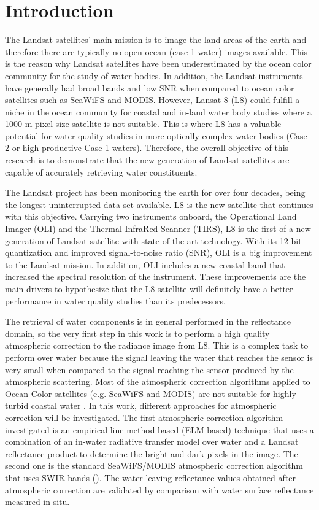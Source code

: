 \chapter{Introduction}
\label{ch:introduction} 
The Landsat satellites' main mission is to image the land areas of the earth and therefore there are typically no open ocean (case 1 water) images available. This is the reason why Landsat satellites have been underestimated by the ocean color community for the study of water bodies. In addition, the Landsat instruments have generally had broad bands and low SNR when compared to ocean color satellites such as SeaWiFS and MODIS. However, Lansat-8 (L8) could fulfill a niche in the ocean community for coastal and in-land water  body studies where a 1000 m pixel size satellite is not suitable. This is where L8 has a valuable potential for water quality studies in more optically complex water bodies (Case 2 or high productive Case 1 waters). Therefore, the overall objective of this research is to demonstrate that the new generation of Landsat satellites are capable of accurately retrieving water constituents.

The Landsat project has been monitoring the earth for over four decades, being the longest uninterrupted data set available. L8 is the new satellite that continues with this objective. Carrying two instruments onboard, the Operational Land Imager (OLI) and the Thermal InfraRed Scanner (TIRS), L8 is the first of a new generation of Landsat satellite with state-of-the-art technology. With its 12-bit quantization and improved signal-to-noise ratio (SNR), OLI is a big improvement to the Landsat mission. In addition, OLI includes a new coastal band that increased the spectral resolution of the instrument. These improvements are the main drivers to hypothesize that the L8 satellite will definitely have a better performance in water quality studies than its predecessors. 

The retrieval of water components is in general performed in the reflectance domain, so the very first step in this work is to perform a high quality atmospheric correction to the radiance image from L8. This is a complex task to perform over water because the signal leaving the water that reaches the sensor is very small when compared to the signal reaching the sensor produced by the atmospheric scattering. Most of the atmospheric correction algorithms applied to Ocean Color satellites (e.g. SeaWiFS and MODIS) are not suitable for highly turbid coastal water \cite{Patt2003}. In this work, different approaches for atmospheric correction will be investigated. The first atmospheric correction algorithm investigated is an empirical line method-based (ELM-based) technique that uses a combination of an in-water radiative transfer model over water and a Landsat reflectance product to determine the bright and dark pixels in the image. The second one is the standard SeaWiFS/MODIS atmospheric correction algorithm that uses SWIR bands (\cite{Wang:2007}). The water-leaving reflectance values obtained after atmospheric correction are validated by comparison with water surface reflectance measured in situ. 

